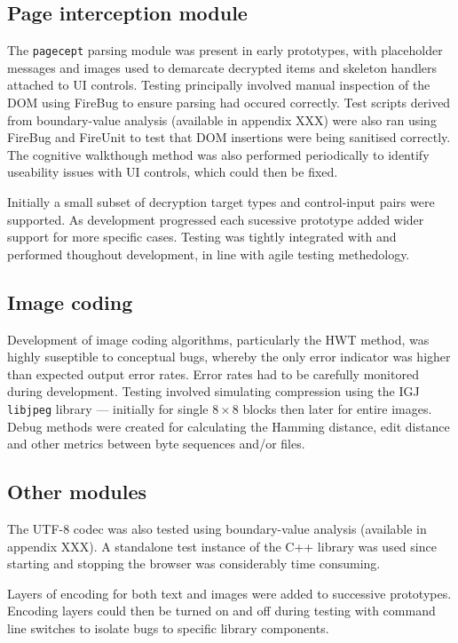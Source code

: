 \subsection{Page interception module}

The {\tt pagecept} parsing module was present in early prototypes, with placeholder messages and images used to demarcate decrypted items and skeleton handlers attached to UI controls. Testing principally involved manual inspection of the DOM using FireBug to ensure parsing had occured correctly. Test scripts derived from boundary-value analysis (available in appendix XXX) were also ran using FireBug and FireUnit to test that DOM insertions were being sanitised correctly. The cognitive walkthough method was also performed periodically to identify useability issues with UI controls, which could then be fixed.

Initially a small subset of decryption target types and control-input pairs were supported. As development progressed each sucessive prototype added wider support for more specific cases. Testing was tightly integrated with and performed thoughout development, in line with agile testing methedology.


\subsection{Image coding}

Development of image coding algorithms, particularly the HWT method, was highly suseptible to conceptual bugs, whereby the only error indicator was higher than expected output error rates. Error rates had to be carefully monitored during development. Testing involved simulating compression using the IGJ {\tt libjpeg} library --- initially for single $8 \times 8$ blocks then later for entire images. Debug methods were created for calculating the Hamming distance, edit distance and other metrics between byte sequences and/or files.


\subsection{Other modules}

The UTF-8 codec was also tested using boundary-value analysis (available in appendix XXX). A standalone test instance of the C++ library was used since starting and stopping the browser was considerably time consuming.

Layers of encoding for both text and images were added to successive prototypes. Encoding layers could then be turned on and off during testing with command line switches to isolate bugs to specific library components.


